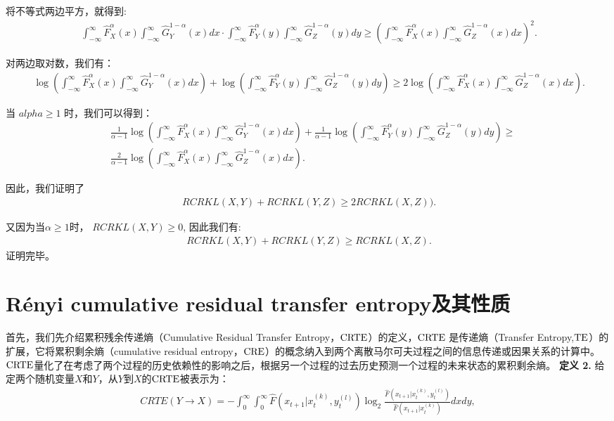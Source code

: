 将不等式两边平方，就得到:
\begin{align*}\
\int_{-\infty}^{\infty} \hat F_{X}^{\alpha}(x) \int_{-\infty}^{\infty} \hat G_{Y}^{1-\alpha}(x)dx \cdot \int_{-\infty}^{\infty} \hat F_{Y}^{\alpha}(y) \int_{-\infty}^{\infty} \hat G_{Z}^{1-\alpha}(y)dy \ge  (\int_{-\infty}^{\infty} \hat F_{X}^{\alpha}(x) \int_{-\infty}^{\infty} \hat G_{Z}^{1-\alpha}(x)dx)^{2}.
\end{align*}

对两边取对数，我们有：
\begin{align*}\
\log(\int_{-\infty}^{\infty} \hat F_{X}^{\alpha}(x) \int_{-\infty}^{\infty} \hat G_{Y}^{1-\alpha}(x)dx)+ \log(\int_{-\infty}^{\infty} \hat F_{Y}^{\alpha}(y) \int_{-\infty}^{\infty} \hat G_{Z}^{1-\alpha}(y)dy) \ge 2\log (\int_{-\infty}^{\infty} \hat F_{X}^{\alpha}(x) \int_{-\infty}^{\infty} \hat G_{Z}^{1-\alpha}(x)dx).
\end{align*}

当 $alpha \ge 1$ 时，我们可以得到：
\begin{align*}\
&\frac{1}{\alpha-1}\log(\int_{-\infty}^{\infty} \hat F_{X}^{\alpha}(x) \int_{-\infty}^{\infty} \hat G_{Y}^{1-\alpha}(x)dx)+ \frac{1}{\alpha-1}\log(\int_{-\infty}^{\infty} \hat F_{Y}^{\alpha}(y) \int_{-\infty}^{\infty} \hat G_{Z}^{1-\alpha}(y)dy) \ge\\
& \frac{2}{\alpha-1}\log (\int_{-\infty}^{\infty} \hat F_{X}^{\alpha}(x) \int_{-\infty}^{\infty} \hat G_{Z}^{1-\alpha}(x)dx).
\end{align*}

因此，我们证明了
\begin{align*}\
RCRKL(X,Y) +RCRKL(Y,Z) \ge 2 RCRKL(X, Z)).
\end{align*}

又因为当$\alpha \ge 1$时， $RCRKL(X,Y) \ge 0$, 因此我们有:
\begin{align*}\
RCRKL(X,Y) +RCRKL(Y,Z) \ge  RCRKL(X, Z).
\end{align*}
证明完毕。\\

\section{R\'{e}nyi cumulative residual transfer entropy及其性质}
首先，我们先介绍累积残余传递熵（Cumulative Residual Transfer Entropy，$\rm{CRTE}$）的定义，$\rm{CRTE}$ 是传递熵（Transfer Entropy,$\rm{TE}$）的扩展，它将累积剩余熵（cumulative residual entropy，$\rm{CRE}$）的概念纳入到两个离散马尔可夫过程之间的信息传递或因果关系的计算中。$\rm{CRTE}$量化了在考虑了两个过程的历史依赖性的影响之后，根据另一个过程的过去历史预测一个过程的未来状态的累积剩余熵。
\textbf{定义 2.} 给定两个随机变量$X$和$Y$，从$Y$到$X$的$\rm{CRTE}$被表示为：
\begin{align}\label{CRTE}
CRTE(Y \rightarrow X) = -\int_{0}^{\infty} \int_{0}^{\infty} \hat{F}(x_{t+1}|x_t^{(k)}, y_{t}^{(l)}) \log_{2} \frac{\hat{F}(x_{t+1}|x_t^{(k)}, y_{t}^{(l)})}{\hat{F}(x_{t+1}|x_{t}^{(k)})}  dx dy,
\end{align}

